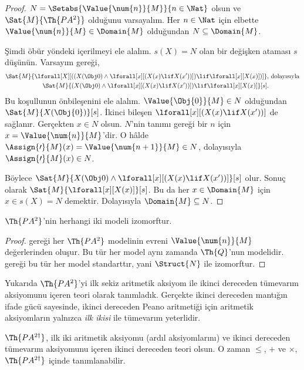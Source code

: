 \documentclass[../../../include/open-logic-section]{subfiles}
\begin{document}
\begin{proof}
$N=\Setabs{\Value{\num{n}}{M}}{n\in\Nat}$ olsun ve
$\Sat{M}{\Th{PA^2}}$ olduğunu varsayalım. Her $n\in\Nat$ için elbette
$\Value{\num{n}}{M}\in\Domain{M}$ olduğundan $N\subseteq\Domain{M}$.

Şimdi öbür yöndeki içerilmeyi ele alalım. $s(X)=N$ olan bir değişken ataması
$s$ düşünün. Varsayım gereği,
\begin{align*}
\Sat{M}{\lforall[X][((X(\Obj 0) \land \lforall[x][(X(x)
      \lif X(x'))]) \lif \lforall[x][X(x)])]}, & \text{ dolayısıyla}\\
\Sat{M}{(X(\Obj 0) \land \lforall[x][(X(x) \lif X(x'))]) \lif
  \lforall[x][X(x)]}[s]. & 
\end{align*}
Bu koşullunun önbileşenini ele alalım. $\Value{\Obj{0}}{M}\in N$ olduğundan
$\Sat{M}{X(\Obj{0})}[s]$. İkinci bileşen
$\lforall[x][(X(x)\lif X(x'))]$ de sağlanır. Gerçekten $x\in N$ olsun.
$N$'nin tanımı gereği bir $n$ için $x=\Value{\num{n}}{M}$'dir. O hâlde
$\Assign{\prime}{M}(x)=\Value{\num{n+1}}{M}\in N$, dolayısıyla
$\Assign{\prime}{M}(x)\in N$.

Böylece $\Sat{M}{X(\Obj 0) \land \lforall[x][(X(x) \lif X(x'))]}[s]$ olur.
Sonuç olarak $\Sat{M}{\lforall[x][X(x)]}[s]$. Bu da her
$x\in\Domain{M}$ için $x\in s(X)=N$ demektir. Dolayısıyla
$\Domain{M}\subseteq N$.
\end{proof}

\begin{cor}
$\Th{PA^2}$'nin herhangi iki modeli izomorftur.
\end{cor}

\begin{proof}
 gereği her $\Th{PA^2}$ modelinin evreni
$\Value{\num{n}}{M}$ değerlerinden oluşur. Bu tür her model aynı zamanda
$\Th{Q}$'nun modelidir.  gereği bu
tür her model standarttır, yani $\Struct{N}$ ile izomorftur.
\end{proof}

Yukarıda $\Th{PA^2}$'yi ilk sekiz aritmetik aksiyom ile ikinci dereceden
tümevarım aksiyomunu içeren teori olarak tanımladık. Gerçekte ikinci
dereceden mantığın ifade gücü sayesinde, ikinci dereceden Peano aritmetiği
için aritmetik aksiyomların yalnızca \emph{ilk ikisi} ile tümevarım yeterlidir.

\begin{prop}
$\Th{PA^{2\dagger}}$, ilk iki aritmetik aksiyomu (ardıl aksiyomlarını) ve
ikinci dereceden tümevarım aksiyomunu içeren ikinci dereceden teori olsun.
O zaman $\le$, $+$ ve $\times$, $\Th{PA^{2\dagger}}$ içinde tanımlanabilir.
\end{prop}
\end{document}
